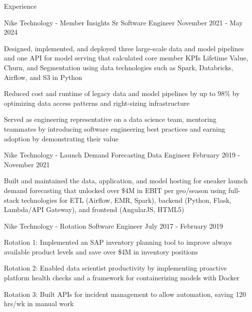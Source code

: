 \documentclass{resume}
\begin{document}
\begin{rSection}{Experience}
\begin{rSubsection}{Nike Technology - Member Insights}
                   {}
                   {Sr Software Engineer}
                   {November 2021 - May 2024}
    \item Designed, implemented, and deployed three large-scale data and model pipelines and one API for model serving
          that calculated core member KPIs Lifetime Value, Churn, and Segmentation using data technologies such as
          Spark, Databricks, Airflow, and S3 in Python
    \item Reduced cost and runtime of legacy data and model pipelines by up to 98\% by optimizing data access patterns
          and right-sizing infrastructure
    \item Served as engineering representative on a data science team, mentoring teammates by introducing software engineering best practices
          and earning adoption by demonstrating their value
\vspace{-2mm}
\end{rSubsection}


\begin{rSubsection}{Nike Technology - Launch Demand Forecasting}
                   {}
                   {Data Engineer}
                   {February 2019 - November 2021}
    \item Built and maintained the data, application, and model hosting for sneaker launch
          demand forecasting that unlocked over \$4M in EBIT per geo/season using full-stack technologies for
          ETL (Airflow, EMR, Spark), backend (Python, Flask, Lambda/API Gateway), and frontend (AngularJS, HTML5)
\vspace{-2mm}
\end{rSubsection}


\begin{rSubsection}{Nike Technology - Rotation}
                   {}
                   {Software Engineer}
                   {July 2017 - February 2019}
    \item Rotation 1: Implemented an SAP inventory planning tool to improve always available product levels and save over \$4M in inventory positions
    \item Rotation 2: Enabled data scientist productivity by implementing proactive platform health checks
          and a framework for containerizing models with Docker
    \item Rotation 3: Built APIs for incident management to allow automation, saving 120 hrs/wk in manual work
\vspace{-2mm}
\end{rSubsection}

\end{rSection}
\end{document}
